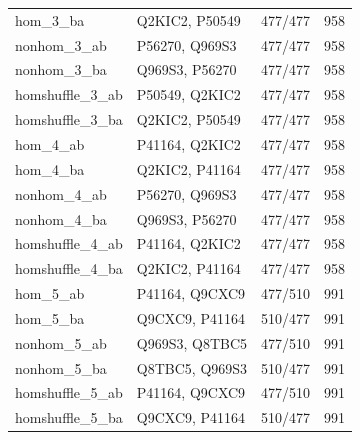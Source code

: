 \documentclass[a4paper,11pt]{scrartcl}
\begin{document}
\begin{longtable}{@{}llll@{}}
hom\_3\_ba & Q2KIC2, P50549 & 477/477 & 958\\
nonhom\_3\_ab & P56270, Q969S3 & 477/477 & 958\\
nonhom\_3\_ba & Q969S3, P56270 & 477/477 & 958\\
homshuffle\_3\_ab & P50549, Q2KIC2 & 477/477 & 958\\
homshuffle\_3\_ba & Q2KIC2, P50549 & 477/477 & 958\\
hom\_4\_ab & P41164, Q2KIC2 & 477/477 & 958\\
hom\_4\_ba & Q2KIC2, P41164 & 477/477 & 958\\
nonhom\_4\_ab & P56270, Q969S3 & 477/477 & 958\\
nonhom\_4\_ba & Q969S3, P56270 & 477/477 & 958\\
homshuffle\_4\_ab & P41164, Q2KIC2 & 477/477 & 958\\
homshuffle\_4\_ba & Q2KIC2, P41164 & 477/477 & 958\\
hom\_5\_ab & P41164, Q9CXC9 & 477/510 & 991\\
hom\_5\_ba & Q9CXC9, P41164 & 510/477 & 991\\
nonhom\_5\_ab & Q969S3, Q8TBC5 & 477/510 & 991\\
nonhom\_5\_ba & Q8TBC5, Q969S3 & 510/477 & 991\\
homshuffle\_5\_ab & P41164, Q9CXC9 & 477/510 & 991\\
homshuffle\_5\_ba & Q9CXC9, P41164 & 510/477 & 991\\
\bottomrule\end{longtable}
\endgroup
\end{document}
